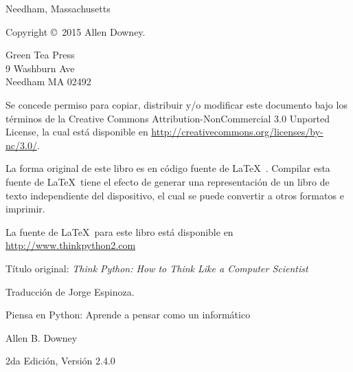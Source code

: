 \documentclass[10pt]{book}
\newcommand{\thetitle}{Piensa en Python: Aprende a pensar como un informático}
\newcommand{\theversion}{2da Edición, Versión 2.4.0}
\newcommand{\thedate}{}
\begin{document}
\begin{latexonly}
\begin{flushright}
{\small Needham, Massachusetts}

\vfill

\end{flushright}


\pagebreak
\thispagestyle{empty}

{\small
Copyright \copyright ~2015 Allen Downey.


\vspace{0.2in}

\begin{flushleft}
Green Tea Press       \\
9 Washburn Ave        \\
Needham MA 02492
\end{flushleft}

Se concede permiso para copiar, distribuir y/o modificar este documento
bajo los términos de la Creative Commons Attribution-NonCommercial
3.0 Unported License, la cual está disponible en \url{http://creativecommons.org/licenses/by-nc/3.0/}.

La forma original de este libro es en código fuente de \LaTeX\ .  Compilar esta
fuente de \LaTeX\ tiene el efecto de generar una representación de un libro de texto
independiente del dispositivo, el cual se puede convertir a otros formatos
e imprimir.

La fuente de \LaTeX\ para este libro está disponible en
\url{http://www.thinkpython2.com}

Título original: {\em Think Python: How to Think Like a Computer Scientist}

Traducción de Jorge Espinoza.

\vspace{0.2in}

} %

\end{latexonly}



\begin{htmlonly}


{\Large \thetitle}

{\large Allen B. Downey}

\theversion

\thedate

\setcounter{chapter}{-1}

\end{htmlonly}
\end{document}
